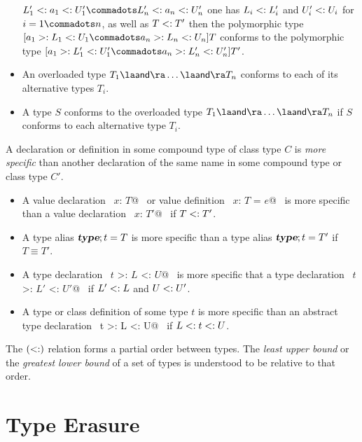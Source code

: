 \documentclass[a4paper,12pt,twoside,titlepage]{book}
\begin{document}
\begin{itemize}
$L'_1 \conforms a_1 \conforms U'_1 \commadots L'_n \conforms a_n \conforms U'_n$ 
one has $L_i <: L'_i$ and $U'_i <: U_i$
for $i = 1 \commadots n$, as well as $T <: T'$ then the polymorphic type
$[a_1 >: L_1 <: U_1 \commadots a_n >: L_n <: U_n] T$ conforms to the polymorphic type
$[a_1 >: L'_1 <: U'_1 \commadots a_n >: L'_n <: U'_n] T'$.
\item 
An overloaded type $T_1 \overload \ldots \overload T_n$ conforms to each of its alternative types $T_i$.
\item
A type $S$ conforms to the overloaded type $T_1 \overload \ldots \overload T_n$
if $S$ conforms to each alternative type $T_i$.
\end{itemize}

A declaration or definition in some compound type of class type $C$
is {\em more specific} than another
declaration of the same name in some compound type or class type $C'$.
\begin{itemize}
\item
A value declaration ~\lstinline@val $x$: $T$@~ or value definition
~\lstinline@val $x$: $T$ = $e$@~ is more specific than a value declaration
~\lstinline@val $x$: $T'$@~ if $T <: T'$.
\item
A type alias
$\mbox{\sl\bfseries type};t=T$ is more specific than a type alias $\mbox{\sl\bfseries type};t=T'$ if
$T \equiv T'$.
\item 
A type declaration ~\lstinline@type $t$ >: $L$ <: $U$@~ is more specific that 
a type declaration ~\lstinline@type $t$ >: $L'$ <: $U'$@~ if $L' <: L$ and 
$U <: U'$.
\item
A type or class definition of some type $t$ is more specific than an abstract
type declaration ~\lstinline@type t >: L <: U@~ if
$L <: t <: U$.
\end{itemize}

The $(<:)$ relation forms a partial order between types. The {\em
least upper bound} or the {\em greatest lower bound} of a set of types
is understood to be relative to that order.

\section{Type Erasure}
\label{sec:erasure}
\end{document}
